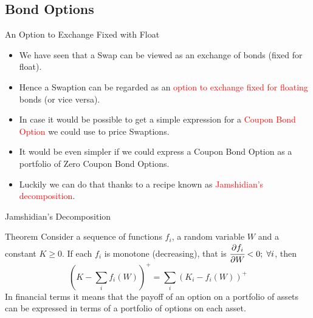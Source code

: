 \documentclass{beamer}
\begin{document}
\subsection{Bond Options}
\begin{frame}{An Option to Exchange Fixed with Float}
\begin{itemize}
	\item<1-> We have seen that a Swap can be viewed as an exchange of bonds (fixed for float).
	\item<2-> Hence a Swaption can be regarded as an \textcolor{red}{option to exchange fixed for floating} bonds (or vice versa).
	\item<3-> In case it would be possible to get a simple expression for a \textcolor{red}{Coupon Bond Option} we could use to price Swaptions.
	\item <4-> It would be even simpler if we could express a Coupon Bond Option as a portfolio of Zero Coupon Bond Options.
	\item<5-> Luckily we can do that thanks to a recipe known as \textcolor{red}{Jamshidian's decomposition}.
\end{itemize}
\end{frame}

\begin{frame}{Jamshidian's Decomposition}
\begin{block}{Theorem}
	Consider a sequence of functions $f_i$, a random variable $W$ and a constant $K\ge0$. If each $f_i$ is monotone (decreasing), that is $\cfrac{\partial f_i}{\partial W} < 0;\;\forall i$, then 
	\begin{equation*}
		\left(K - \sum_i f_i(W)\right)^+ = 	\sum_i \left(K_i - f_i(W)\right)^+
	\end{equation*} 
	In financial terms it means that the payoff of an option on a portfolio of assets can be expressed in terms of a portfolio of options on each asset.
\end{block}
\end{frame}
\end{document}
